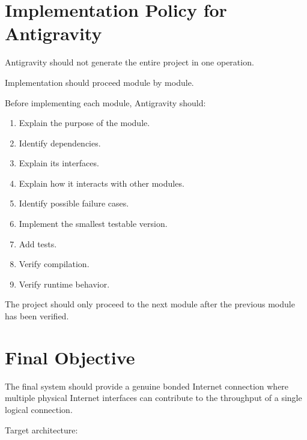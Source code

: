 \documentclass[12pt,a4paper]{article}
\begin{document}

\section{Implementation Policy for Antigravity}

Antigravity should not generate the entire project in one operation.

Implementation should proceed module by module.

Before implementing each module, Antigravity should:

\begin{enumerate}
    \item Explain the purpose of the module.
    \item Identify dependencies.
    \item Explain its interfaces.
    \item Explain how it interacts with other modules.
    \item Identify possible failure cases.
    \item Implement the smallest testable version.
    \item Add tests.
    \item Verify compilation.
    \item Verify runtime behavior.
\end{enumerate}

The project should only proceed to the next module after the previous module has been verified.


\section{Final Objective}

The final system should provide a genuine bonded Internet connection where multiple physical Internet interfaces can contribute to the throughput of a single logical connection.

Target architecture:
\end{document}
